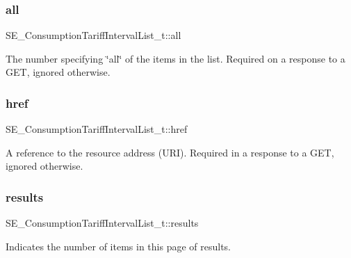 \subsubsection{\texorpdfstring{all}{all}}
{\footnotesize\ttfamily S\+E\+\_\+\+Consumption\+Tariff\+Interval\+List\+\_\+t\+::all}

The number specifying \char`\"{}all\char`\"{} of the items in the list. Required on a response to a G\+ET, ignored otherwise. \mbox{\label{group__ConsumptionTariffIntervalList_ga489e67a6df6a55b687177b242b485f48}} 
\subsubsection{\texorpdfstring{href}{href}}
{\footnotesize\ttfamily S\+E\+\_\+\+Consumption\+Tariff\+Interval\+List\+\_\+t\+::href}

A reference to the resource address (U\+RI). Required in a response to a G\+ET, ignored otherwise. \mbox{\label{group__ConsumptionTariffIntervalList_gad7dfbe5bbec12b1511d6f80a360f710f}} 
\subsubsection{\texorpdfstring{results}{results}}
{\footnotesize\ttfamily S\+E\+\_\+\+Consumption\+Tariff\+Interval\+List\+\_\+t\+::results}

Indicates the number of items in this page of results. 
